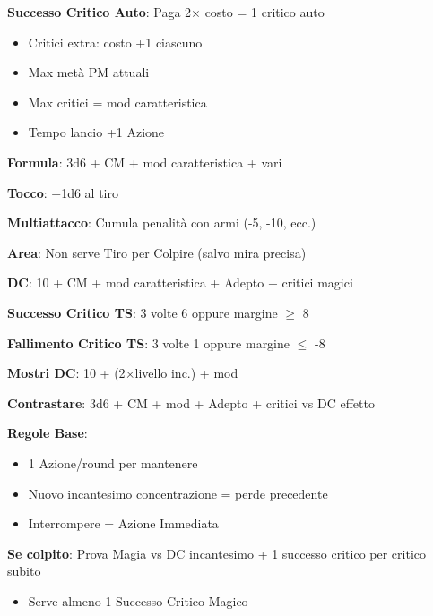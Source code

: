\documentclass[10pt,a4paper,landscape]{article}
\begin{document}
\begin{multicols}{3}
\begin{tcolorbox}[title=POTENZIARE PROVE MAGIA]
			\textbf{Successo Critico Auto}: Paga 2$\times$ costo = 1 critico auto
			\begin{itemize}[leftmargin=*,noitemsep]
				\item Critici extra: costo +1 ciascuno
				\item Max metà PM attuali
				\item Max critici = mod caratteristica
				\item Tempo lancio +1 Azione
			\end{itemize}
		\end{tcolorbox}
		
		\begin{tcolorbox}[title=TIRO PER COLPIRE INCANTESIMI]
			\textbf{Formula}: 3d6 + CM + mod caratteristica + vari
			
			\textbf{Tocco}: +1d6 al tiro
			
			\textbf{Multiattacco}: Cumula penalità con armi (-5, -10, ecc.)
			
			\textbf{Area}: Non serve Tiro per Colpire (salvo mira precisa)
		\end{tcolorbox}
		
		\begin{tcolorbox}[title=TIRI SALVEZZA INCANTESIMI]
			\textbf{DC}: 10 + CM + mod caratteristica + Adepto + critici magici
			
			\textcolor{successcolor}{\textbf{Successo Critico TS}}: 3 volte 6 oppure margine $\geq$ 8
			
			\textcolor{criticalcolor}{\textbf{Fallimento Critico TS}}: 3 volte 1 oppure margine $\leq$ -8
			
			\textbf{Mostri DC}: 10 + (2$\times$livello inc.) + mod
			
			\textbf{Contrastare}: 3d6 + CM + mod + Adepto + critici vs DC effetto
		\end{tcolorbox}
		
		\begin{tcolorbox}[title=CONCENTRAZIONE]
			\textbf{Regole Base}:
			\begin{itemize}[leftmargin=*,noitemsep]
				\item 1 Azione/round per mantenere
				\item Nuovo incantesimo concentrazione = perde precedente
				\item Interrompere = Azione Immediata
			\end{itemize}
			
			\textbf{Se colpito}: Prova Magia vs DC incantesimo + 1 successo critico per critico subito
			\begin{itemize}[leftmargin=*,noitemsep]
				\item Serve almeno 1 Successo Critico Magico
			\end{itemize}
			

\end{tcolorbox}
\end{multicols}
\end{document}
